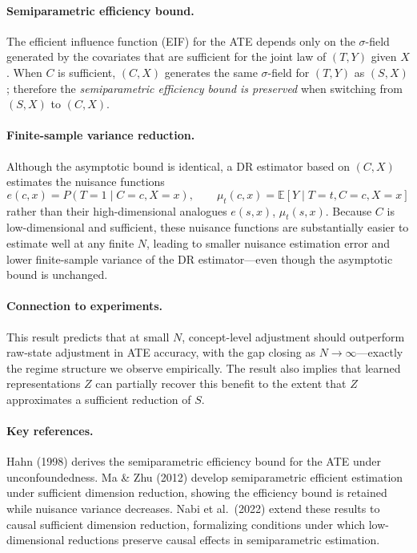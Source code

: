 \documentclass{article}
\begin{document}
\paragraph{Semiparametric efficiency bound.} The efficient influence function (EIF)
for the ATE depends only on the $\sigma$-field generated by the covariates that are
sufficient for the joint law of $(T, Y)$ given $X$.\cite{hahn1998role} When $C$ is
sufficient, $(C, X)$ generates the same $\sigma$-field for $(T, Y)$ as $(S, X)$;
therefore the \emph{semiparametric efficiency bound is preserved} when switching
from $(S, X)$ to $(C, X)$.

\paragraph{Finite-sample variance reduction.} Although the asymptotic bound is
identical, a DR estimator based on $(C, X)$ estimates the nuisance functions
\[
e(c,x) = P(T{=}1 \mid C{=}c, X{=}x), \qquad
\mu_t(c,x) = \mathbb{E}[Y \mid T{=}t, C{=}c, X{=}x]
\]
rather than their high-dimensional analogues $e(s,x)$, $\mu_t(s,x)$. Because $C$
is low-dimensional and sufficient, these nuisance functions are substantially easier
to estimate well at any finite $N$, leading to smaller nuisance estimation error and
lower finite-sample variance of the DR estimator---even though the asymptotic bound
is unchanged.\cite{ma2012semiparametric,nabi2022causal}

\paragraph{Connection to experiments.} This result predicts that at small $N$,
concept-level adjustment should outperform raw-state adjustment in ATE accuracy,
with the gap closing as $N \to \infty$---exactly the regime structure we observe
empirically. The result also implies that learned representations $Z$ can partially
recover this benefit to the extent that $Z$ approximates a sufficient reduction of
$S$.

\paragraph{Key references.} Hahn (1998)\cite{hahn1998role} derives the
semiparametric efficiency bound for the ATE under unconfoundedness. Ma \&
Zhu (2012)\cite{ma2012semiparametric} develop semiparametric efficient estimation
under sufficient dimension reduction, showing the efficiency bound is retained while
nuisance variance decreases. Nabi et al.\ (2022)\cite{nabi2022causal} extend these
results to causal sufficient dimension reduction, formalizing conditions under which
low-dimensional reductions preserve causal effects in semiparametric estimation.
\end{document}
